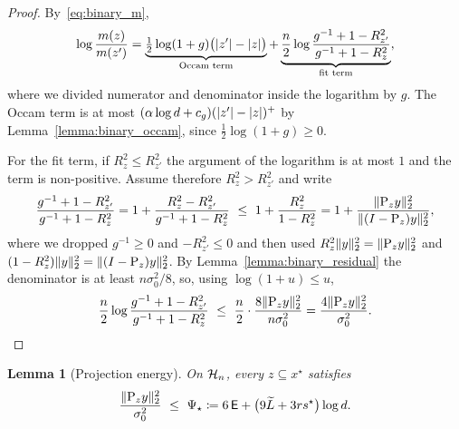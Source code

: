 \documentclass[aos]{imsart}%
\DeclarePairedDelimiter{\norm}{\lVert}{\rVert}
\DeclarePairedDelimiter{\abs}{\lvert}{\rvert}
\theoremstyle{plain}
\newtheorem{lemma}[theorem]{Lemma}
\theoremstyle{definition}
\begin{document}
    \begin{proof}
        By~\eqref{eq:binary_m},
        \begin{equation}
            \label{eq:binary_comp_split}
            \log\frac{m(z)}{m(z')}
            =\underbrace{\tfrac12\log(1+g)\bigl(\abs{z'}-\abs{z}\bigr)}
            _{\text{Occam term}}
            +\underbrace{\frac n2
            \log\frac{g^{-1}+1-R^{2}_{z'}}{g^{-1}+1-R^{2}_{z}}}
            _{\text{fit term}},
        \end{equation}
        where we divided numerator and denominator inside the logarithm by $g$.
        The Occam term is at most $(\alpha\log d+c_g)(\abs{z'}-\abs z)^{+}$ by
        Lemma~\ref{lemma:binary_occam}, since $\tfrac12\log(1+g)\geq0$.

        For the fit term, if $R^{2}_{z}\leq R^{2}_{z'}$ the argument of the
        logarithm is at most $1$ and the term is non-positive. Assume therefore
        $R^{2}_{z}>R^{2}_{z'}$ and write
        \begin{equation*}
            \frac{g^{-1}+1-R^{2}_{z'}}{g^{-1}+1-R^{2}_{z}}
            =1+\frac{R^{2}_{z}-R^{2}_{z'}}{g^{-1}+1-R^{2}_{z}}
            \ \leq\ 1+\frac{R^{2}_{z}}{1-R^{2}_{z}}
            =1+\frac{\norm{\Proj_zy}_2^{2}}{\norm{(I-\Proj_z)y}_2^{2}} ,
        \end{equation*}
        where we dropped $g^{-1}\geq0$ and $-R^{2}_{z'}\leq0$ and then used
        $R^{2}_z\norm y_2^{2}=\norm{\Proj_zy}_2^{2}$ and
        $(1-R^{2}_z)\norm y_2^{2}=\norm{(I-\Proj_z)y}_2^{2}$. By
        Lemma~\ref{lemma:binary_residual} the denominator is at least
        $n\sigma_0^{2}/8$, so, using $\log(1+u)\leq u$,
        \begin{equation*}
            \frac n2\log\frac{g^{-1}+1-R^{2}_{z'}}{g^{-1}+1-R^{2}_{z}}
            \ \leq\ \frac n2\cdot
            \frac{8\norm{\Proj_zy}_2^{2}}{n\sigma_0^{2}}
            =\frac{4\norm{\Proj_zy}_2^{2}}{\sigma_0^{2}} . \qedhere
        \end{equation*}
    \end{proof}

    \begin{lemma}[Projection energy]
        \label{lemma:binary_projenergy}
        On $\mathcal{H}_n$, every $z\subseteq x^{\star}$ satisfies
        \begin{equation}
            \label{eq:binary_projenergy}
            \frac{\norm{\Proj_zy}_2^{2}}{\sigma_0^{2}}\ \leq\ \Psi_\star
            \coloneq6\,\Energy+\bigl(9\Ltil+3rs^{\star}\bigr)\log d .
        \end{equation}
    \end{lemma}
\end{document}
